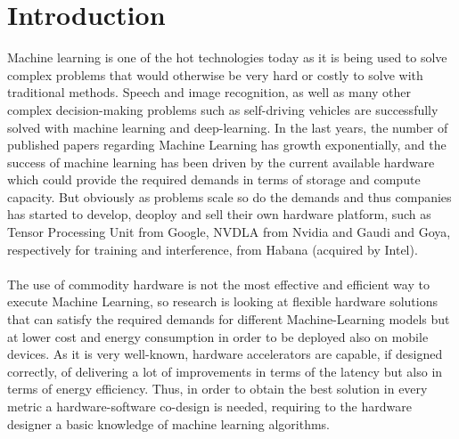 \chapter{Introduction}
Machine learning is one of the hot technologies today as it is being used to solve complex problems that would otherwise be very hard or costly to solve with traditional methods. Speech and image recognition, as well as many other complex decision-making problems such as self-driving vehicles are successfully solved with machine learning and deep-learning. 
In the last years, the number of published papers regarding Machine Learning has growth exponentially, and the success of machine learning has been driven by the current available hardware which could provide the required demands in terms of storage and compute capacity. But obviously as problems scale so do the demands and thus companies has started to develop, deoploy and sell their own hardware platform,  such as Tensor Processing Unit \cite{paper:40} from Google, NVDLA\cite{WEBSITE:6} from Nvidia and Gaudi \cite{paper:39} and Goya\cite{paper:38}, respectively for training and interference, from Habana (acquired by Intel). \\\\
The use of commodity hardware is not the most effective and efficient way to execute Machine Learning, so research is looking at flexible hardware solutions\cite{paper:1} \cite{paper:2} that can satisfy the required demands for different Machine-Learning models but at lower cost and energy consumption in order to be deployed also on mobile devices.
As it is very well-known, hardware accelerators are capable, if designed correctly, of delivering a lot of improvements in terms of the latency but also in terms of energy efficiency\cite{paper:29}. Thus, in order to obtain the best solution in every metric a hardware-software co-design is needed, requiring to the hardware designer a basic knowledge of machine learning algorithms.\\\\

